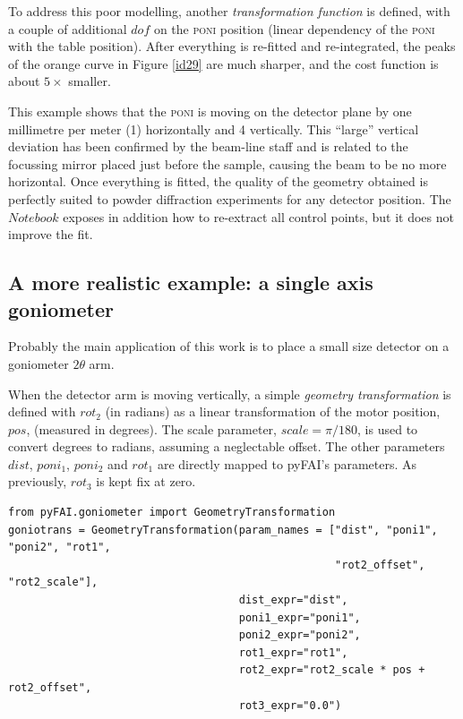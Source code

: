 \documentclass[preprint, pdf]{iucr}              %
\begin{document}
 
To address this poor modelling, another \textit{transformation function} is
defined, with a couple of additional $dof$ on the \textsc{poni} position
(linear dependency of the \textsc{poni} with the table position).
After everything is re-fitted and re-integrated, the peaks of the orange curve
in Figure \ref{id29} are much sharper, and the cost function is about $5\times$
smaller. 

This example shows that the \textsc{poni} is moving on the detector
plane by one millimetre per meter (1\textperthousand) horizontally and 
4 \textperthousand vertically.
This ``large'' vertical deviation has been confirmed by the beam-line staff and
is related to the focussing mirror placed just before the sample, causing the
beam to be no more horizontal.
Once everything is fitted, the quality of the geometry obtained is perfectly
suited to powder diffraction experiments for any detector position. The
$Notebook$ exposes in addition how to re-extract all control points, but it
does not improve the fit. 
  
\subsection{A more realistic example: a single axis goniometer}

Probably the main application of this work is to place a small size detector
on a goniometer $2\theta$ arm. 

When the detector arm is moving vertically, a simple \textit{geometry
transformation} is defined with $rot_2$ (in radians) as a
linear transformation of the motor position, $pos$, (measured in degrees).
The scale parameter, $scale = \pi / 180$, is used to convert degrees to radians, 
assuming a neglectable offset.
The other parameters $dist$, $poni_1$, $poni_2$ and $rot_1$ are directly mapped
to pyFAI's parameters.
As previously, $rot_3$ is kept fix at zero.

\begin{verbatim}
from pyFAI.goniometer import GeometryTransformation
goniotrans = GeometryTransformation(param_names = ["dist", "poni1", "poni2", "rot1",
                                                   "rot2_offset", "rot2_scale"],
                                    dist_expr="dist", 
                                    poni1_expr="poni1",
                                    poni2_expr="poni2", 
                                    rot1_expr="rot1", 
                                    rot2_expr="rot2_scale * pos + rot2_offset", 
                                    rot3_expr="0.0")
\end{verbatim}
\end{document}
